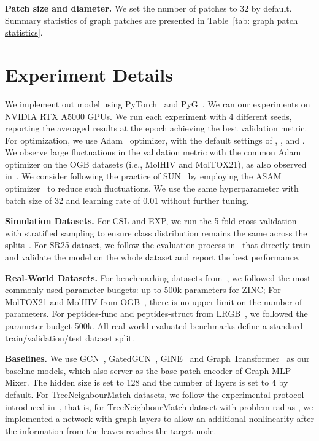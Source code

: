 \documentclass{article}
\begin{document}
\textbf{Patch size and diameter.}
We set the number of patches to 32 by default. Summary statistics of graph patches are presented in Table~\ref{tab: graph patch statistics}.



\section{Experiment Details}\label{app: experiment}

We implement out model using PyTorch~\citep{pytorch} and PyG~\citep{pyg}. We ran our experiments on NVIDIA RTX A5000 GPUs.
We run each experiment with 4 different seeds, reporting the averaged results at the epoch achieving the best validation metric. For optimization, we use Adam~\citep{kingma2014adam} optimizer, with the default settings of , , and . 
We observe large fluctuations in the validation metric with the common Adam optimizer on the OGB datasets (i.e., MolHIV and MolTOX21), as also observed in~\citep{sun, zhang2021nested, chen2019equivalence}. 
We consider following the practice of SUN~\citep{sun} by employing the ASAM optimizer~\citep{kwon2021asam} to reduce such fluctuations. We use the same hyperparameter with batch size of 32 and learning rate of 0.01 without further tuning.



\textbf{Simulation Datasets.}
For CSL and EXP, we run the 5-fold cross validation with stratified sampling to ensure class distribution remains the same across the splits~\cite{dwivedi2020benchmarking, zhang2021nested}. For SR25 dataset, we follow the evaluation process in~\citep{zhao2021stars, feng2022powerful} that directly train and validate the model on the whole dataset and report the best performance.

\textbf{Real-World Datasets.}
For benchmarking datasets from~\citet{dwivedi2020benchmarking}, we followed the most commonly used parameter budgets:  up to 500k parameters for ZINC; For MolTOX21 and MolHIV from OGB~\citep{hu2020open}, there is no upper limit on the number of parameters. For peptides-func and peptides-struct from LRGB~\citep{dwivedi2022long}, we followed the parameter budget 500k. All real world evaluated benchmarks define a standard train/validation/test dataset split. 


\textbf{Baselines.} 
We use GCN~\citep{kipf2017semi}, GatedGCN~\citep{bresson2017gatedgcn}, GINE~\citep{hu2019gine} and Graph Transformer~\citep{dwivedi2021generalization} as our baseline models, which also server as the base patch encoder of Graph MLP-Mixer. The hidden size is set to 128 and the number of layers is set to 4 by default. For TreeNeighbourMatch datasets, we follow the experimental protocol introduced in~\citep{alon2020bottleneck}, that is, for TreeNeighbourMatch dataset with problem radias , we implemented a network with  graph layers to allow an additional nonlinearity after the information from the leaves reaches the target node. 
\end{document}
